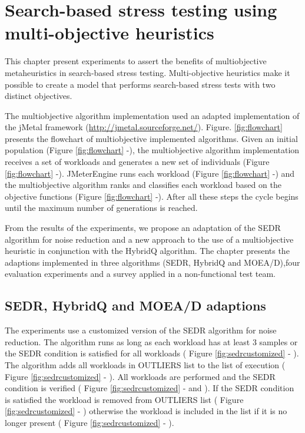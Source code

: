 \documentclass[espaco=umemeio,chapter=TITLE,twoside,openright]{abnt}
\begin{document}
\chapter{Search-based stress testing using multi-objective heuristics}

This chapter present experiments to assert the benefits of multiobjective metaheuristics in search-based stress testing. Multi-objective heuristics make it possible to create a model that performs search-based stress tests with  two distinct objectives. 

The multiobjective algorithm implementation used an adapted implementation of the jMetal framework (\url{http://jmetal.sourceforge.net/}). Figure. \ref{fig:flowchart} presents the flowchart of  multiobjective implemented algorithms. Given an initial population (Figure \ref{fig:flowchart}  -),  the multiobjective algorithm implementation receives a set of workloads  and generates a new set of individuals  (Figure \ref{fig:flowchart}  -).  JMeterEngine runs each workload (Figure \ref{fig:flowchart}  -) and the multiobjective algorithm ranks and classifies each workload based on the objective functions  (Figure \ref{fig:flowchart}  -).  After all these steps the cycle begins until the maximum number of generations is reached.

From the results of the experiments, we propose an adaptation of the SEDR algorithm for noise reduction and a new approach to the use of a multiobjective heuristic in conjunction with the HybridQ algorithm. The chapter presents the adaptions implemented in three algorithms (SEDR, HybridQ and MOEA/D),four evaluation experiments and a survey applied in a non-functional test team. 

\section{SEDR, HybridQ and MOEA/D adaptions}

The experiments use a customized version of the SEDR algorithm for noise reduction. The algorithm runs as long as each workload has at least 3 samples or the SEDR condition is satisfied for all workloads ( Figure \ref{fig:sedrcustomized} - ). The algorithm adds all workloads in OUTLIERS list to the list of execution ( Figure \ref{fig:sedrcustomized} - ). All workloads are performed and the SEDR condition is verified  ( Figure \ref{fig:sedrcustomized} -  and  ). If the SEDR condition is satisfied the workload is removed from OUTLIERS list ( Figure \ref{fig:sedrcustomized} - ) otherwise the workload is included in the list if it is no longer present ( Figure \ref{fig:sedrcustomized} - ). 
\end{document}
